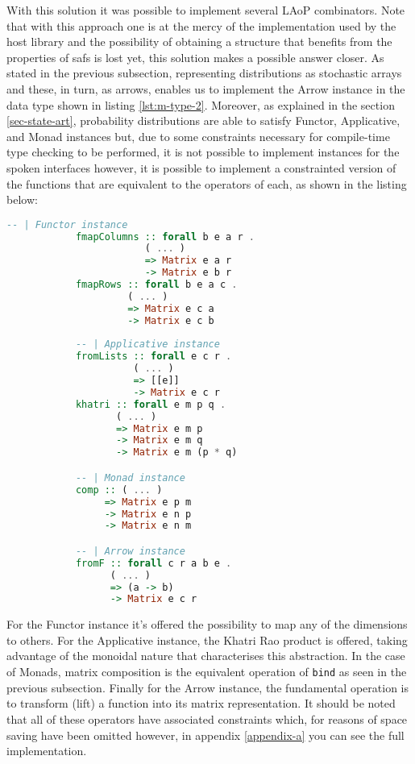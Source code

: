 \documentclass[
  oneside,
  11pt, a4paper,
  footinclude=true,
  headinclude=true,
  cleardoublepage=empty
]{scrbook}
\theoremstyle{definition}
\theoremstyle{definition}
\begin{document}
        With this solution it was possible to implement several LAoP combinators. Note that with this approach one is at the mercy of the implementation used by the host library and the possibility of obtaining a structure that benefits from the properties of \gls{saf}s is lost yet, this solution makes a possible answer closer. As stated in the previous subsection, representing distributions as stochastic arrays and these, in turn, as arrows, enables us to implement the Arrow instance in the data type shown in listing \ref{lst:m-type-2}. Moreover, as explained in the section \ref{sec-state-art}, probability distributions are able to satisfy Functor, Applicative, and Monad instances but, due to some constraints necessary for compile-time type checking to be performed, it is not possible to implement instances for the spoken interfaces however, it is possible to implement a constrainted version of the functions that are equivalent to the operators of each, as shown in the listing below:
        
        \begin{lstlisting}[language=Haskell, caption={Interface equivalent function implementations},captionpos=b]
            -- | Functor instance
            fmapColumns :: forall b e a r . 
                        ( ... )
                        => Matrix e a r
                        -> Matrix e b r
            fmapRows :: forall b e a c . 
                     ( ... )
                     => Matrix e c a 
                     -> Matrix e c b
                     
            -- | Applicative instance
            fromLists :: forall e c r . 
                      ( ... ) 
                      => [[e]] 
                      -> Matrix e c r
            khatri :: forall e m p q .
                   ( ... )
                   => Matrix e m p 
                   -> Matrix e m q
                   -> Matrix e m (p * q)

            -- | Monad instance
            comp :: ( ... )
                 => Matrix e p m
                 -> Matrix e n p 
                 -> Matrix e n m

            -- | Arrow instance
            fromF :: forall c r a b e . 
                  ( ... ) 
                  => (a -> b) 
                  -> Matrix e c r
        \end{lstlisting}{}
        
        For the Functor instance it's offered the possibility to map any of the dimensions to others. For the Applicative instance, the Khatri Rao product is offered, taking advantage of the monoidal nature that characterises this abstraction. In the case of Monads, matrix composition is the equivalent operation of \texttt{bind} as seen in the previous subsection. Finally for the Arrow instance, the fundamental operation is to transform (lift) a function into its matrix representation. It should be noted that all of these operators have associated constraints which, for reasons of space saving have been omitted however, in appendix \ref{appendix-a} you can see the full implementation.
        
\end{document}
